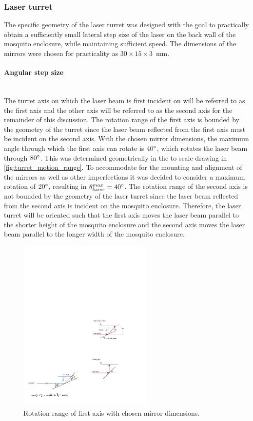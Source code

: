 \subsubsection{Laser turret}
The specific geometry of the laser turret was designed with the goal to practically obtain a sufficiently small lateral step size of the laser on the back wall of the mosquito enclosure, while maintaining sufficient speed. The dimensions of the mirrors were chosen for practicality as $30 \times 15 \times 3$~mm.


\label{par:angular_step_size}
\paragraph{Angular step size}\mbox{}\\
The turret axis on which the laser beam is first incident on will be referred to as the first axis and the other axis will be referred to as the second axis for the remainder of this discussion. The rotation range of the first axis is bounded by the geometry of the turret since the laser beam reflected from the first axis must be incident on the second axis. With the chosen mirror dimensions, the maximum angle through which the first axis can rotate is $40^{\circ}$, which rotates the laser beam through $80^{\circ}$. This was determined geometrically in the to scale drawing in \autoref{fig:turret_motion_range}. To accommodate for the mounting and alignment of the mirrors as well as other imperfections it was decided to consider a maximum rotation of $20^{\circ}$, resulting in $\theta_{laser}^{max} = 40^{\circ}$. The rotation range of the second axis is not bounded by the geometry of the laser turret since the laser beam reflected from the second axis is incident on the mosquito enclosure. Therefore, the laser turret will be oriented such that the first axis moves the laser beam parallel to the shorter height of the mosquito enclosure and the second axis moves the laser beam parallel to the longer width of the mosquito enclosure.
\begin{figure}[h]
  \centering
  \includegraphics[width=0.6\textwidth]{figures/hardware_design/rotation_range_of_first_axis.pdf}
  \caption{Rotation range of first axis with chosen mirror dimensions.}
  \label{fig:turret_motion_range}
\end{figure}

